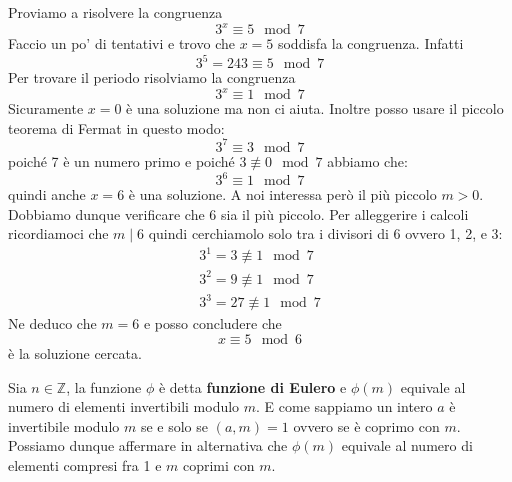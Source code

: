 \begin{example}
	Proviamo a risolvere la congruenza
	\begin{equation*}
		3^x \equiv 5 \mod{7}
	\end{equation*}
	Faccio un po' di tentativi e trovo che $x = 5$ soddisfa la congruenza. Infatti
	\begin{equation*}
		3^5 = 243 \equiv 5 \mod{7}
	\end{equation*}
	Per trovare il periodo risolviamo la congruenza
	\begin{equation*}
		3^x \equiv 1 \mod{7}
	\end{equation*}
	Sicuramente $x = 0$ \`e una soluzione ma non ci aiuta. Inoltre posso usare il piccolo teorema di
	Fermat in questo modo:
	\begin{equation*}
		3^7 \equiv 3 \mod{7}
	\end{equation*}
	poich\'e 7 \`e un numero primo e poich\'e $3 \not \equiv 0 \mod{7}$ abbiamo che:
	\begin{equation*}
		3^6 \equiv 1 \mod{7}
	\end{equation*}
	quindi anche $x = 6$ \`e una soluzione. A noi interessa per\`o il pi\`u piccolo $m > 0$.
	Dobbiamo dunque verificare che 6 sia il pi\`u piccolo. Per alleggerire i calcoli ricordiamoci che
	$m \mid 6$ quindi cerchiamolo solo tra i divisori di 6 ovvero 1, 2, e 3:
	\begin{equation*}
		\begin{array}{c}
			3^1 = 3 \not \equiv 1 \mod{7} \\
			3^2 = 9 \not \equiv 1 \mod{7} \\
			3^3 = 27 \not \equiv 1 \mod{7}
		\end{array}
	\end{equation*}
	Ne deduco che $m = 6$ e posso concludere che
	\begin{equation*}
		x \equiv 5 \mod{6}
	\end{equation*}
	\`e la soluzione cercata.
\end{example}

\begin{definition}
	Sia $n \in \mathbb{Z}$, la funzione $\phi$ \`e detta \textbf{funzione di Eulero} e
	$\phi (m)$ equivale al numero di elementi invertibili modulo $m$. E come sappiamo un intero
	$a$ \`e invertibile modulo $m$ se e solo se $(a, m) = 1$ ovvero se \`e coprimo con $m$.
	Possiamo dunque affermare in alternativa che $\phi (m)$ equivale al numero di elementi
	compresi fra 1 e $m$ coprimi con $m$.
\end{definition}

